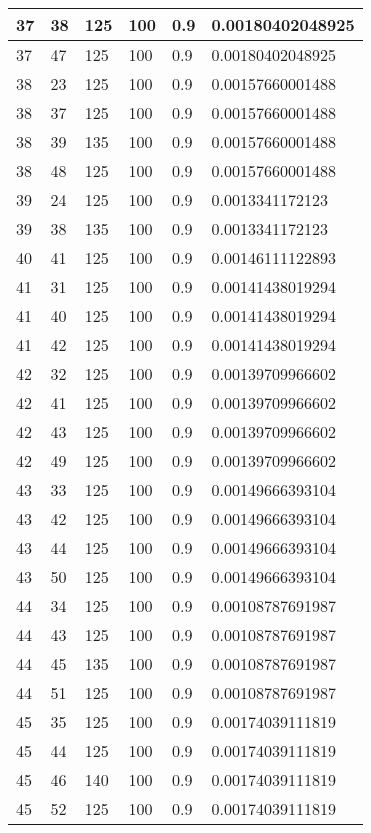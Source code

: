 \begin{longtable}{|l|l|l|l|l|l|}
37 & 38 & 125 & 100 & 0.9 & 0.00180402048925 \\ \hline
37 & 47 & 125 & 100 & 0.9 & 0.00180402048925 \\ \hline
38 & 23 & 125 & 100 & 0.9 & 0.00157660001488 \\ \hline
38 & 37 & 125 & 100 & 0.9 & 0.00157660001488 \\ \hline
38 & 39 & 135 & 100 & 0.9 & 0.00157660001488 \\ \hline
38 & 48 & 125 & 100 & 0.9 & 0.00157660001488 \\ \hline
39 & 24 & 125 & 100 & 0.9 & 0.0013341172123  \\ \hline
39 & 38 & 135 & 100 & 0.9 & 0.0013341172123  \\ \hline
40 & 41 & 125 & 100 & 0.9 & 0.00146111122893 \\ \hline
41 & 31 & 125 & 100 & 0.9 & 0.00141438019294 \\ \hline
41 & 40 & 125 & 100 & 0.9 & 0.00141438019294 \\ \hline
41 & 42 & 125 & 100 & 0.9 & 0.00141438019294 \\ \hline
42 & 32 & 125 & 100 & 0.9 & 0.00139709966602 \\ \hline
42 & 41 & 125 & 100 & 0.9 & 0.00139709966602 \\ \hline
42 & 43 & 125 & 100 & 0.9 & 0.00139709966602 \\ \hline
42 & 49 & 125 & 100 & 0.9 & 0.00139709966602 \\ \hline
43 & 33 & 125 & 100 & 0.9 & 0.00149666393104 \\ \hline
43 & 42 & 125 & 100 & 0.9 & 0.00149666393104 \\ \hline
43 & 44 & 125 & 100 & 0.9 & 0.00149666393104 \\ \hline
43 & 50 & 125 & 100 & 0.9 & 0.00149666393104 \\ \hline
44 & 34 & 125 & 100 & 0.9 & 0.00108787691987 \\ \hline
44 & 43 & 125 & 100 & 0.9 & 0.00108787691987 \\ \hline
44 & 45 & 135 & 100 & 0.9 & 0.00108787691987 \\ \hline
44 & 51 & 125 & 100 & 0.9 & 0.00108787691987 \\ \hline
45 & 35 & 125 & 100 & 0.9 & 0.00174039111819 \\ \hline
45 & 44 & 125 & 100 & 0.9 & 0.00174039111819 \\ \hline
45 & 46 & 140 & 100 & 0.9 & 0.00174039111819 \\ \hline
45 & 52 & 125 & 100 & 0.9 & 0.00174039111819 \\ \hline

\end{longtable}
